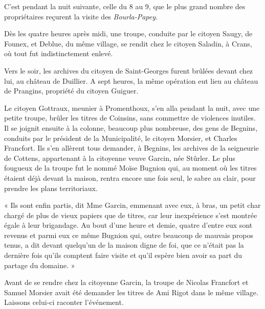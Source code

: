 \documentclass[french,twoside]{book} %
\newenvironment{quoteblock}%
  {\begin{quoting}}
  {\end{quoting}}
\newenvironment{quotebar}{%
    \def\FrameCommand{{\color{rubric!10!}\vrule width 0.5em} \hspace{0.9em}}%
    \def\OuterFrameSep{\itemsep} %
    \MakeFramed {\advance\hsize-\width \FrameRestore}
  }%
  {%
    \endMakeFramed
  }
\renewenvironment{quoteblock}%
  {%
    \savenotes
    \setstretch{0.9}
    \begin{quotebar}
  }
  {%
    \end{quotebar}
    \spewnotes
  }
\begin{document}
\noindent C’est pendant la nuit suivante, celle du 8 au 9, que le plus grand nombre des propriétaires reçurent la visite des \emph{Bourla-Papey.}\par
Dès les quatre heures après midi, une troupe, conduite par le citoyen Saugy, de Founex, et Deblue, du même village, se rendit chez le citoyen Saladin, à Crans, où tout fut indistinctement enlevé.\par
Vers le soir, les archives du citoyen de Saint-Georges furent brûlées devant chez lui, au château de Duillier. A sept heures, la même opération eut lieu au château de Prangins, propriété du citoyen Guiguer.\par
Le citoyen Gottraux, meunier à Promenthoux, s’en alla pendant la nuit, avec une petite troupe, brûler les titres de Coinsins, sans commettre de violences inutiles. Il se joignit ensuite à la colonne, beaucoup plus nombreuse, des gens de Begnins, conduits par le président de la Municipalité, le citoyen Morsier, et Charles Francfort. Ils s’en allèrent tous demander, à Begnins, les archives de la seigneurie de Cottens, appartenant à la citoyenne veuve Garcin, née Stûrler. Le plus fougueux de la troupe fut le nommé Moïse Bugnion qui, au moment où les titres étaient déjà devant la maison, rentra encore une fois seul, le sabre au clair, pour prendre les plans territoriaux.\par

\begin{quoteblock}
 \noindent « Ils sont enfin partis, dit Mme Garcin, emmenant avec eux, à bras, un petit char chargé de plus de vieux papiers que de titres, car leur inexpérience s’est montrée égale à leur brigandage. Au bout d’une heure et demie, quatre d’entre eux sont revenus et parmi eux ce même Bugnion qui, outre beaucoup de mauvais propos tenus, a dit devant quelqu’un de la maison digne de foi, que ce n’était pas la dernière fois qu’ils comptent faire visite et qu’il espère bien avoir sa part du partage du domaine. »
 \end{quoteblock}

\noindent Avant de se rendre chez la citoyenne Garcin, la troupe de Nicolas Francfort et Samuel Morsier avait été demander les titres de Ami Rigot dans le même village. Laissons celui-ci raconter l’événement.\par
\end{document}
